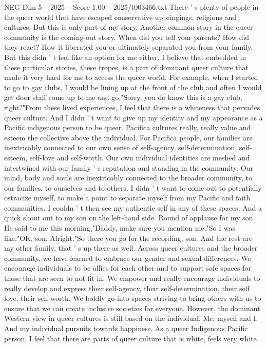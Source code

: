 \begin{textsample}{NEG Dim 5 – 2025 – Score 1.00 – 2025/t003466.txt}
There ' s plenty of people in the queer world that have escaped conservative upbringings, religions and cultures.
But this is only part of my story.
Another common story in the queer community is the coming-out story.
When did you tell your parents?
How did they react?
How it liberated you or ultimately separated you from your family.
But this didn ' t feel like an option for me either.
I believe that embedded in these particular stories, these tropes, is a part of dominant queer culture that made it very hard for me to access the queer world.
For example, when I started to go to gay clubs, I would be lining up at the front of the club and often I would get door staff come up to me and go,"Sorry, you do know this is a gay club, right?"From these lived experiences, I feel that there is a whiteness that pervades queer culture.
And I didn ' t want to give up my identity and my appearance as a Pacific indigenous person to be queer.
Pacifica cultures really, really value and esteem the collective above the individual.
For Pacifica people, our families are inextricably connected to our own sense of self-agency, self-determination, self-esteem, self-love and self-worth.
Our own individual identities are meshed and intertwined with our family ' s reputation and standing in the community.
Our mind, body and souls are inextricably connected to the broader community, to our families, to ourselves and to others.
I didn ' t want to come out to potentially ostracize myself, to make a point to separate myself from my Pacific and faith communities.
I couldn ' t then see my authentic self in any of these spaces.
And a quick shout out to my son on the left-hand side.
Round of applause for my son.
He said to me this morning,"Daddy, make sure you mention me."So I was like,"OK, son.
Alright."So there you go for the recording, son.
And the rest are my other family, that ' s up there as well.
Across queer cultures and the broader community, we have learned to embrace our gender and sexual differences.
We encourage individuals to be allies for each other and to support safe spaces for those that are seen to not fit in.
We empower and really encourage individuals to really develop and express their self-agency, their self-determination, their self love, their self-worth.
We boldly go into spaces striving to bring others with us to ensure that we can create inclusive societies for everyone.
However, the dominant Western view in queer cultures is still based on the individual.
Me, myself and I.
And my individual pursuits towards happiness.
As a queer Indigenous Pacific person, I feel that there are parts of queer culture that is white, feels very white.

\end{textsample}
